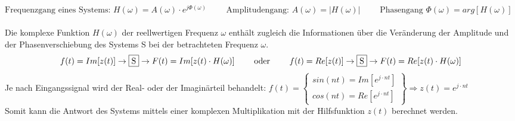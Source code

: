 $ \text{Frequenzgang eines Systems: } H(\omega) = A(\omega) \cdot e^{j \Phi(\omega)} \qquad 
\text{ Amplitudengang: } A(\omega) = |H(\omega)| \qquad \text{ Phasengang } \Phi(\omega) = arg[H(\omega)] $ \\ \\
Die komplexe Funktion $H(\omega)$ der reellwertigen Frequenz $\omega$ enthält zugleich die Informationen über 
die Veränderung der Amplitude und der Phasenverschiebung des Systems S bei der betrachteten Frequenz $\omega$.
$$f(t) = Im[z(t)] \to \fbox{S}\to F(t) = Im[z(t) \cdot H(\omega)] \qquad \text{ oder } 
\qquad f(t) = Re[z(t)] \to \fbox{S}\to F(t) = Re[z(t) \cdot H(\omega)]$$
Je nach Eingangssignal wird der Real- oder der Imaginärteil behandelt: 
$ f(t) = 
    \left\{
    \begin{array}{l}
           sin(n t) = Im[e^{j \cdot n t}]\\
           cos(n t) = Re[e^{j \cdot n t}]
        \end{array}
    \right\}
\Longrightarrow
z(t) = e^{j \cdot n t}
$ \\

Somit kann die Antwort des Systems mittels einer komplexen Multiplikation mit der Hilfsfunktion $z(t)$ berechnet werden.

